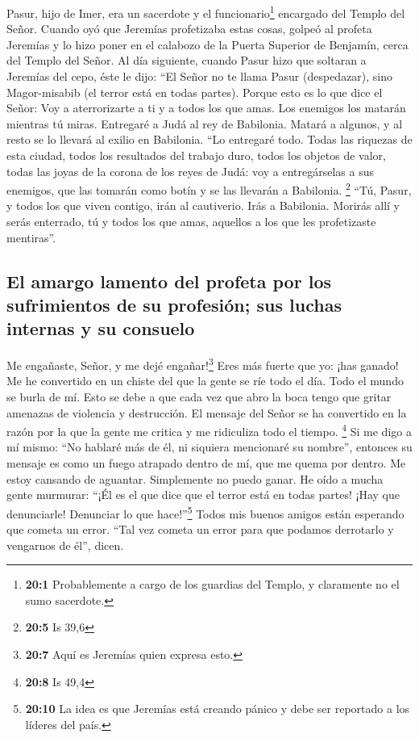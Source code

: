  Pasur, hijo de Imer, era un sacerdote y el
funcionario\footnote{\textbf{20:1} Probablemente a cargo de los guardias
  del Templo, y claramente no el sumo sacerdote.} encargado del Templo
del Señor. Cuando oyó que Jeremías profetizaba estas cosas,
 golpeó al profeta Jeremías y lo hizo poner en el calabozo
de la Puerta Superior de Benjamín, cerca del Templo del Señor.
 Al día siguiente, cuando Pasur hizo que soltaran a
Jeremías del cepo, éste le dijo: ``El Señor no te llama Pasur
(despedazar), sino Magor-misabib (el terror está en todas partes).
 Porque esto es lo que dice el Señor: Voy a aterrorizarte
a ti y a todos los que amas. Los enemigos los matarán mientras tú miras.
Entregaré a Judá al rey de Babilonia. Matará a algunos, y al resto se lo
llevará al exilio en Babilonia.  ``Lo entregaré todo.
Todas las riquezas de esta ciudad, todos los resultados del trabajo
duro, todos los objetos de valor, todas las joyas de la corona de los
reyes de Judá: voy a entregárselas a sus enemigos, que las tomarán como
botín y se las llevarán a Babilonia. \footnote{\textbf{20:5} Is 39,6}
 ``Tú, Pasur, y todos los que viven contigo, irán al
cautiverio. Irás a Babilonia. Morirás allí y serás enterrado, tú y todos
los que amas, aquellos a los que les profetizaste mentiras''.

\hypertarget{el-amargo-lamento-del-profeta-por-los-sufrimientos-de-su-profesiuxf3n-sus-luchas-internas-y-su-consuelo}{%
\subsection{El amargo lamento del profeta por los sufrimientos de su
profesión; sus luchas internas y su
consuelo}\label{el-amargo-lamento-del-profeta-por-los-sufrimientos-de-su-profesiuxf3n-sus-luchas-internas-y-su-consuelo}}

 Me engañaste, Señor, y me dejé engañar!\footnote{\textbf{20:7}
  Aquí es Jeremías quien expresa esto.} Eres más fuerte que yo: ¡has
ganado! Me he convertido en un chiste del que la gente se ríe todo el
día. Todo el mundo se burla de mí.  Esto se debe a que
cada vez que abro la boca tengo que gritar amenazas de violencia y
destrucción. El mensaje del Señor se ha convertido en la razón por la
que la gente me critica y me ridiculiza todo el tiempo. \footnote{\textbf{20:8}
  Is 49,4}  Si me digo a mí mismo: ``No hablaré más de él,
ni siquiera mencionaré su nombre'', entonces su mensaje es como un fuego
atrapado dentro de mí, que me quema por dentro. Me estoy cansando de
aguantar. Simplemente no puedo ganar.  He oído a mucha
gente murmurar: ``¡Él es el que dice que el terror está en todas partes!
¡Hay que denunciarle! Denunciar lo que hace!''\footnote{\textbf{20:10}
  La idea es que Jeremías está creando pánico y debe ser reportado a los
  líderes del país.} Todos mis buenos amigos están esperando que cometa
un error. ``Tal vez cometa un error para que podamos derrotarlo y
vengarnos de él'', dicen.

